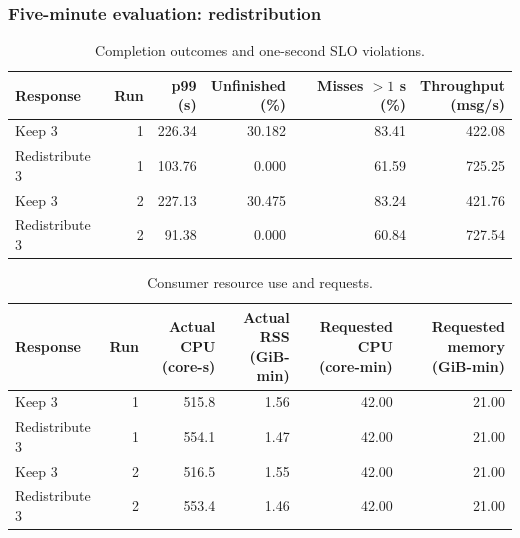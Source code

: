 \subsubsection{Five-minute evaluation: redistribution}
\begin{table}[!htbp]
\centering\small
\setlength{\tabcolsep}{3pt}
\renewcommand{\arraystretch}{1.12}
\begin{tabular}{@{}lrrrrr@{}}
\toprule
Response & Run & \shortstack{p99\\(s)} & \shortstack{Unfinished\\(\%)} & \shortstack{Misses $>1$ s\\(\%)} & \shortstack{Throughput\\(msg/s)}\\
\midrule
Keep 3 & 1 & 226.34 & 30.182 & 83.41 & 422.08\\
Redistribute 3 & 1 & 103.76 & 0.000 & 61.59 & 725.25\\
Keep 3 & 2 & 227.13 & 30.475 & 83.24 & 421.76\\
Redistribute 3 & 2 & 91.38 & 0.000 & 60.84 & 727.54\\
\bottomrule
\end{tabular}
\caption{Completion outcomes and one-second SLO violations.}
\label{tab:short-redistribution-outcomes}
\end{table}
\begin{table}[!htbp]
\centering\small
\setlength{\tabcolsep}{3pt}
\renewcommand{\arraystretch}{1.12}
\begin{tabular}{@{}lrrrrr@{}}
\toprule
Response & Run & \shortstack{Actual CPU\\(core-s)} & \shortstack{Actual RSS\\(GiB-min)} & \shortstack{Requested CPU\\(core-min)} & \shortstack{Requested memory\\(GiB-min)}\\
\midrule
Keep 3 & 1 & 515.8 & 1.56 & 42.00 & 21.00\\
Redistribute 3 & 1 & 554.1 & 1.47 & 42.00 & 21.00\\
Keep 3 & 2 & 516.5 & 1.55 & 42.00 & 21.00\\
Redistribute 3 & 2 & 553.4 & 1.46 & 42.00 & 21.00\\
\bottomrule
\end{tabular}
\caption{Consumer resource use and requests.}
\label{tab:short-redistribution-resources}
\end{table}
